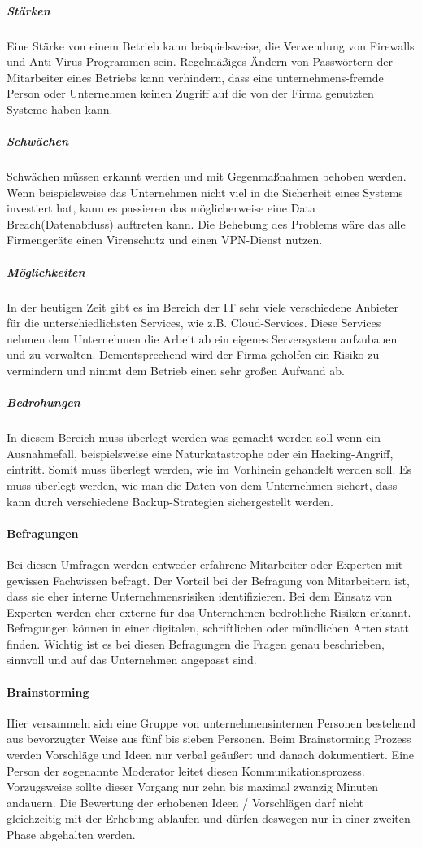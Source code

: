 \subparagraph{Stärken}
Eine Stärke von einem Betrieb kann beispielsweise, die Verwendung von Firewalls und Anti-Virus Programmen sein. Regelmäßiges Ändern von Passwörtern der Mitarbeiter eines Betriebs kann verhindern, dass eine unternehmens-fremde Person oder Unternehmen keinen Zugriff auf die von der Firma genutzten Systeme haben kann.

\subparagraph{Schwächen}
Schwächen müssen erkannt werden und mit Gegenmaßnahmen behoben werden.
Wenn beispielsweise das Unternehmen nicht viel in die Sicherheit eines Systems investiert hat, kann es passieren das möglicherweise eine Data Breach(Datenabfluss) auftreten kann. Die Behebung des Problems wäre das alle Firmengeräte einen Virenschutz und einen VPN-Dienst nutzen.


\subparagraph{Möglichkeiten}
In der heutigen Zeit gibt es im Bereich der IT sehr viele verschiedene Anbieter für die unterschiedlichsten Services, wie z.B. Cloud-Services.
Diese Services nehmen dem Unternehmen die Arbeit ab ein eigenes Serversystem aufzubauen und zu verwalten. Dementsprechend wird der Firma geholfen ein Risiko zu vermindern und nimmt dem Betrieb einen sehr großen Aufwand ab. 

\subparagraph{Bedrohungen}
In diesem Bereich muss überlegt werden was gemacht werden soll wenn ein Ausnahmefall, beispielsweise eine Naturkatastrophe oder ein Hacking-Angriff, eintritt. Somit muss überlegt werden, wie im Vorhinein gehandelt werden soll. Es muss überlegt werden, wie man die Daten von dem Unternehmen sichert, dass kann durch verschiedene Backup-Strategien sichergestellt werden.


\paragraph{Befragungen}
Bei diesen Umfragen werden entweder erfahrene Mitarbeiter oder Experten mit gewissen Fachwissen befragt. Der Vorteil bei der Befragung von Mitarbeitern ist, dass sie eher interne Unternehmensrisiken identifizieren. Bei dem Einsatz von Experten werden eher externe für das Unternehmen bedrohliche Risiken erkannt. Befragungen können in einer digitalen, schriftlichen oder mündlichen Arten statt finden.
Wichtig ist es bei diesen Befragungen die Fragen genau beschrieben, sinnvoll und auf das Unternehmen angepasst sind.

\paragraph{Brainstorming}
Hier versammeln sich eine Gruppe von unternehmensinternen Personen bestehend aus bevorzugter Weise aus fünf bis sieben Personen. 
Beim Brainstorming Prozess werden Vorschläge und Ideen nur verbal geäußert und danach dokumentiert. Eine Person der sogenannte Moderator leitet diesen Kommunikationsprozess. Vorzugsweise sollte dieser Vorgang nur zehn bis maximal zwanzig Minuten andauern.
Die Bewertung der erhobenen Ideen / Vorschlägen darf nicht gleichzeitig mit der Erhebung ablaufen und dürfen deswegen nur in einer zweiten Phase abgehalten werden.

